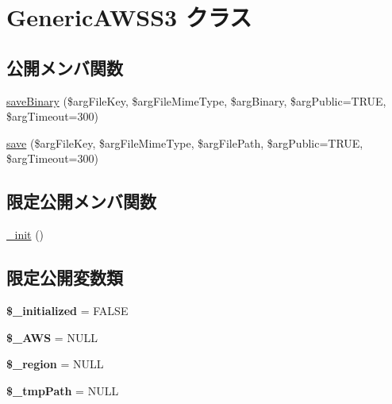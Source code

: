 \hypertarget{class_generic_a_w_s_s3}{}\section{Generic\+A\+W\+S\+S3 クラス}
\label{class_generic_a_w_s_s3}
\subsection*{公開メンバ関数}
\begin{DoxyCompactItemize}
\item 
\hyperlink{class_generic_a_w_s_s3_a9905ad75d5b06e7a254d86c5586f299d}{save\+Binary} (\$arg\+File\+Key, \$arg\+File\+Mime\+Type, \$arg\+Binary, \$arg\+Public=T\+R\+U\+E, \$arg\+Timeout=300)
\item 
\hyperlink{class_generic_a_w_s_s3_afbe0433ef2ba924f0afc28156140d290}{save} (\$arg\+File\+Key, \$arg\+File\+Mime\+Type, \$arg\+File\+Path, \$arg\+Public=T\+R\+U\+E, \$arg\+Timeout=300)
\end{DoxyCompactItemize}
\subsection*{限定公開メンバ関数}
\begin{DoxyCompactItemize}
\item 
\hyperlink{class_generic_a_w_s_s3_a1ba02e0ab932bb162c1fccb2c0069176}{\+\_\+init} ()
\end{DoxyCompactItemize}
\subsection*{限定公開変数類}
\begin{DoxyCompactItemize}
\item 
\hypertarget{class_generic_a_w_s_s3_a99102853009c75bcda0ec20ddad9ffb5}{}{\bfseries \$\+\_\+initialized} = F\+A\+L\+S\+E\label{class_generic_a_w_s_s3_a99102853009c75bcda0ec20ddad9ffb5}

\item 
\hypertarget{class_generic_a_w_s_s3_a3562ac7d06c99eae6938982889d39ac1}{}{\bfseries \$\+\_\+\+A\+W\+S} = N\+U\+L\+L\label{class_generic_a_w_s_s3_a3562ac7d06c99eae6938982889d39ac1}

\item 
\hypertarget{class_generic_a_w_s_s3_a25ada7d1c87a6b07e19efbaaf97b3436}{}{\bfseries \$\+\_\+region} = N\+U\+L\+L\label{class_generic_a_w_s_s3_a25ada7d1c87a6b07e19efbaaf97b3436}

\item 
\hypertarget{class_generic_a_w_s_s3_a909359ca4aff87a58825df4a4f67a5dc}{}{\bfseries \$\+\_\+tmp\+Path} = N\+U\+L\+L\label{class_generic_a_w_s_s3_a909359ca4aff87a58825df4a4f67a5dc}

\end{DoxyCompactItemize}


